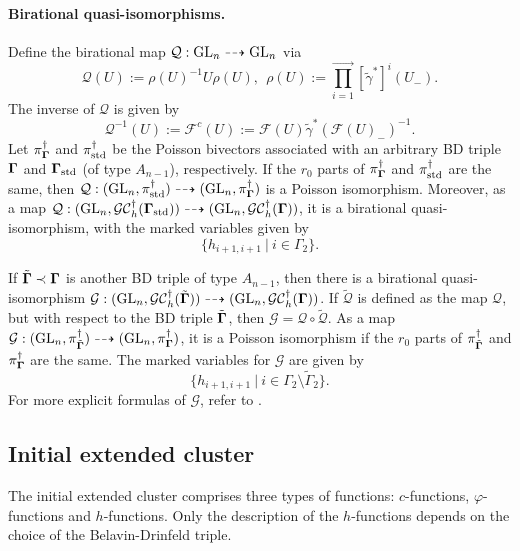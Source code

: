 \paragraph{Birational quasi-isomorphisms.} Define the birational map $\mathcal{Q}:\operatorname{GL}_n \dashrightarrow \operatorname{GL}_n$ via
\begin{equation}
    \mathcal{Q}(U):= \rho(U)^{-1} U \rho(U), \ \ \rho(U):=\prod_{i=1}^{\rightarrow}[\tilde{\gamma}^*]^{i}(U_-).
\end{equation}
The inverse of $\mathcal{Q}$ is given by
\begin{equation}
    \mathcal{Q}^{-1}(U):=\mathcal{F}^c(U):= \mathcal{F}(U)\tilde{\gamma}^*(\mathcal{F}(U)_-)^{-1}.
\end{equation}
Let $\pi_{\mathbf{\Gamma}}^{\dagger}$ and $\pi_{\text{std}}^{\dagger}$ be the Poisson bivectors associated with an arbitrary BD triple $\mathbf{\Gamma}$ and $\mathbf{\Gamma}_{\text{std}}$ (of type $A_{n-1}$), respectively. If the $r_0$ parts of $\pi_{\mathbf{\Gamma}}^{\dagger}$ and $\pi_{\text{std}}^{\dagger}$ are the same, then $\mathcal{Q}:(\operatorname{GL}_n,\pi_{\text{std}}^{\dagger}) \dashrightarrow (\operatorname{GL}_n,\pi_{\mathbf{\Gamma}}^{\dagger})$ is a Poisson isomorphism. Moreover, as a map $\mathcal{Q}:(\operatorname{GL}_n,\mathcal{GC}_h^{\dagger}(\mathbf{\Gamma}_{\text{std}}))\dashrightarrow (\operatorname{GL}_n,\mathcal{GC}_h^{\dagger}(\mathbf{\Gamma}))$, it is a birational quasi-isomorphism, with the marked variables given by 
\begin{equation}
    \{h_{i+1,i+1} \ | \ i \in \Gamma_2\}.
\end{equation}

If $\tilde{\mathbf{\Gamma}}\prec \mathbf{\Gamma}$ is another BD triple of type $A_{n-1}$, then there is a birational quasi-isomorphism $\mathcal{G}:(\operatorname{GL}_n,\mathcal{GC}_h^{\dagger}(\tilde{\mathbf{\Gamma}})) \dashrightarrow (\operatorname{GL}_n,\mathcal{GC}_h^{\dagger}(\mathbf{\Gamma}))$. If $\tilde{\mathcal{Q}}$ is defined as the map $\mathcal{Q}$, but with respect to the BD triple $\tilde{\mathbf{\Gamma}}$, then $\mathcal{G} = \mathcal{Q}\circ \tilde{\mathcal{Q}}$. As a map $\mathcal{G}:(\operatorname{GL}_n,\pi_{\tilde{\mathbf{\Gamma}}}^{\dagger})\dashrightarrow (\operatorname{GL}_n,\pi_{\mathbf{\Gamma}}^{\dagger})$, it is a Poisson isomorphism if the $r_0$ parts of $\pi_{\tilde{\mathbf{\Gamma}}}^{\dagger}$ and $\pi_{\mathbf{\Gamma}}^{\dagger}$ are the same. The marked variables for $\mathcal{G}$ are given by
\begin{equation}
    \{h_{i+1,i+1} \ | \ i \in \Gamma_2\setminus \tilde{\Gamma}_2\}.
\end{equation}
For more explicit formulas of $\mathcal{G}$, refer to \cite[Section 4.4, Section 4.5]{multdual}.

\subsection{Initial extended cluster} The initial extended cluster comprises three types of functions: $c$-functions, $\varphi$-functions and $h$-functions. Only the description of the $h$-functions depends on the choice of the Belavin-Drinfeld triple.

